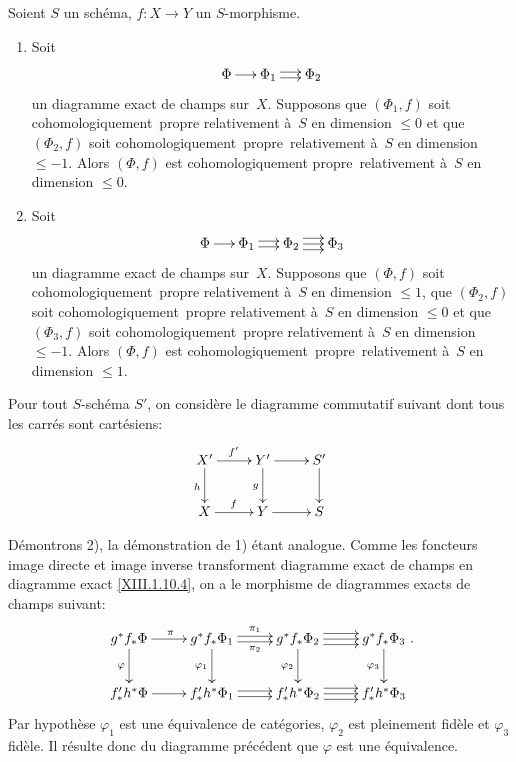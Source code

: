 \begin{proposition}
\label{XIII.1.12}
Soient $S$ un sch\'ema, $f\colon X \to Y$ un $S$-morphisme.
\begin{enumerate}
\item[1)] Soit
$$
\xymatrix@C=.5cm{{\Phi}\ar[r]&{\Phi_1}\ar@<2pt>[r]\ar@<-2pt>[r]&{\Phi_2}}
$$
un diagramme exact de champs sur~$X$. Supposons que $(\Phi_1, f)$ soit
cohomologique\-ment~propre relativement \`a~$S$ en dimension
$\leqslant 0$ et que $(\Phi_2, f)$ soit cohomologi\-quement~propre~relativement \`a~$S$ en dimension $\leqslant -1$. Alors $(\Phi,f)$
est cohomologiquement propre~relativement \`a~$S$ en dimension
$\leqslant 0$.

\item[2)] Soit
$$
\xymatrix@C=.5cm{{\Phi}\ar[r]&{\Phi_1}\ar@<2pt>[r]\ar@<-2pt>[r]&{\Phi_2}\ar@<4pt>[r]\ar[r]\ar@<-4pt>[r]&{\Phi_3}}
$$
un diagramme exact de champs sur~$X$. Supposons que $(\Phi,f)$ soit
cohomologi\-quement~propre relativement \`a~$S$ en dimension
$\leqslant 1$, que $(\Phi_2, f)$ soit cohomologiquement~propre
relativement \`a~$S$ en dimension $\leqslant 0$ et que
$(\Phi_3, f)$ soit cohomo\-logiquement~propre
relativement
\`a~$S$ en dimension $\leqslant -1$. Alors $(\Phi,f)$ est
cohomologique\-ment~propre~relativement \`a~$S$ en dimension
$\leqslant 1$.
\end{enumerate}
\end{proposition}

Pour tout $S$-sch\'ema $S'$, on consid\`ere le diagramme
commutatif suivant dont tous les carr\'es sont cart\'esiens:
$$
\xymatrix{{X'}\ar[r]^{f'}\ar[d]_h&{Y'}\ar[r]\ar[d]_g&{S'}\ar[d]\\{X}\ar[r]^f&{Y}\ar[r]&{S}}
$$

D\'emontrons 2), la d\'emonstration de 1) \'etant
analogue. Comme les foncteurs image directe et image inverse
transforment diagramme exact de champs en diagramme exact
\eqref{XIII.1.10.4}, on a le morphisme de diagrammes exacts de champs
suivant:
$$
\xymatrix{{g^* f_* \Phi}\ar[r]^\pi\ar[d]_{\varphi}&{g^*
f_* \Phi_1}\ar@<2pt>[r]^{\pi_1}\ar@<-2pt>[r]_{\pi_2}\ar[d]_{\varphi_1}&{g^* f_* \Phi_2}\ar@<4pt>[r]\ar[r]\ar@<-4pt>[r]\ar[d]_{\varphi_2}&{g^* f_* \Phi_3}\ar[d]_{\varphi_3}\\{f'_* h^* \Phi}\ar[r]&{f'_* h^*
\Phi_1}\ar@<2pt>[r]\ar@<-2pt>[r]&{f'_* h^* \Phi_2}\ar@<4pt>[r]\ar[r]\ar@<-4pt>[r]&{f'_* h^* \Phi_3}}
\text{.}
$$
Par hypoth\`ese $\varphi_1$ est une \'equivalence de
cat\'egories, $\varphi_2$ est pleinement fid\`ele et $\varphi_3$
fid\`ele. Il r\'esulte donc du diagramme pr\'ec\'edent que
$\varphi$ est une \'equivalence.

